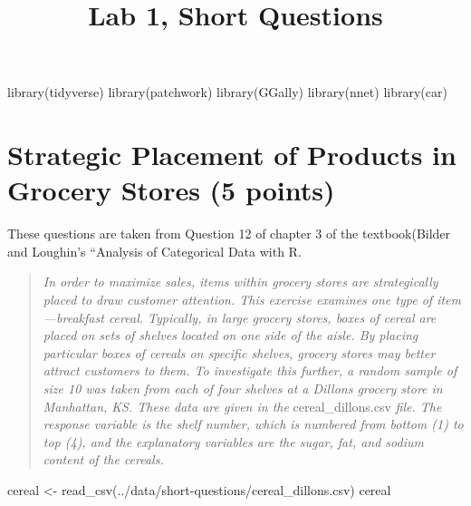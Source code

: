 \documentclass[
  11pt,
]{article}
\title{Lab 1, Short Questions}
\author{}
\date{\vspace{-2.5em}}
\newenvironment{Shaded}{\begin{snugshade}}{\end{snugshade}}
\newcommand{\FunctionTok}[1]{\textcolor[rgb]{0.00,0.00,0.00}{#1}}
\newcommand{\NormalTok}[1]{#1}
\newcommand{\OtherTok}[1]{\textcolor[rgb]{0.56,0.35,0.01}{#1}}
\newcommand{\StringTok}[1]{\textcolor[rgb]{0.31,0.60,0.02}{#1}}
\begin{document}
\maketitle

{
\setcounter{tocdepth}{2}
\tableofcontents
}
\begin{Shaded}
\begin{Highlighting}[]
\FunctionTok{library}\NormalTok{(tidyverse)}
\FunctionTok{library}\NormalTok{(patchwork)}
\FunctionTok{library}\NormalTok{(GGally)}
\FunctionTok{library}\NormalTok{(nnet)}
\FunctionTok{library}\NormalTok{(car)}
\end{Highlighting}
\end{Shaded}

\hypertarget{strategic-placement-of-products-in-grocery-stores-5-points}{%
\section{Strategic Placement of Products in Grocery Stores (5
points)}\label{strategic-placement-of-products-in-grocery-stores-5-points}}

These questions are taken from Question 12 of chapter 3 of the
textbook(Bilder and Loughin's ``Analysis of Categorical Data with R.

\begin{quote}
\emph{In order to maximize sales, items within grocery stores are
strategically placed to draw customer attention. This exercise examines
one type of item---breakfast cereal. Typically, in large grocery stores,
boxes of cereal are placed on sets of shelves located on one side of the
aisle. By placing particular boxes of cereals on specific shelves,
grocery stores may better attract customers to them. To investigate this
further, a random sample of size 10 was taken from each of four shelves
at a Dillons grocery store in Manhattan, KS. These data are given in the
}cereal\_dillons.csv \emph{file. The response variable is the shelf
number, which is numbered from bottom (1) to top (4), and the
explanatory variables are the sugar, fat, and sodium content of the
cereals.}
\end{quote}

\begin{Shaded}
\begin{Highlighting}[]
\NormalTok{cereal }\OtherTok{\textless{}{-}} \FunctionTok{read\_csv}\NormalTok{(}\StringTok{\textquotesingle{}../data/short{-}questions/cereal\_dillons.csv\textquotesingle{}}\NormalTok{)}
\NormalTok{cereal}
\end{Highlighting}
\end{Shaded}
\end{document}
